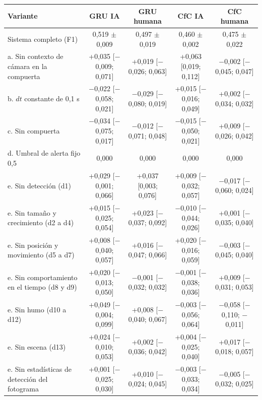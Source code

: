 \begin{tabular}{|l|c|c|c|c|}
\hline
\textbf{Variante} & \textbf{GRU IA} & \textbf{GRU humana} & \textbf{CfC IA} & \textbf{CfC humana} \\ \hline
Sistema completo (F1) & 0{,}519 $\pm$ 0{,}009 & 0{,}497 $\pm$ 0{,}019 & 0{,}460 $\pm$ 0{,}002 & 0{,}475 $\pm$ 0{,}022 \\ \hline
a. Sin contexto de cámara en la compuerta & +0{,}035 [$-$0{,}009; 0{,}071] & +0{,}019 [$-$0{,}026; 0{,}063] & +0{,}063 [0{,}019; 0{,}112] & $-$0{,}002 [$-$0{,}045; 0{,}047] \\ \hline
b. $dt$ constante de 0{,}1 s & $-$0{,}022 [$-$0{,}058; 0{,}021] & $-$0{,}029 [$-$0{,}080; 0{,}019] & +0{,}015 [$-$0{,}016; 0{,}049] & +0{,}002 [$-$0{,}034; 0{,}032] \\ \hline
c. Sin compuerta & $-$0{,}034 [$-$0{,}075; 0{,}017] & $-$0{,}012 [$-$0{,}071; 0{,}048] & $-$0{,}015 [$-$0{,}050; 0{,}021] & +0{,}009 [$-$0{,}026; 0{,}042] \\ \hline
d. Umbral de alerta fijo 0{,}5 & 0{,}000 & 0{,}000 & 0{,}000 & 0{,}000 \\ \hline
e. Sin detección (d1) & +0{,}029 [$-$0{,}001; 0{,}066] & +0{,}037 [0{,}003; 0{,}076] & +0{,}009 [$-$0{,}032; 0{,}057] & $-$0{,}017 [$-$0{,}060; 0{,}024] \\ \hline
e. Sin tamaño y crecimiento (d2 a d4) & +0{,}015 [$-$0{,}025; 0{,}054] & +0{,}023 [$-$0{,}037; 0{,}092] & $-$0{,}010 [$-$0{,}044; 0{,}026] & +0{,}001 [$-$0{,}035; 0{,}040] \\ \hline
e. Sin posición y movimiento (d5 a d7) & +0{,}008 [$-$0{,}040; 0{,}057] & +0{,}016 [$-$0{,}047; 0{,}066] & +0{,}020 [$-$0{,}016; 0{,}059] & $-$0{,}003 [$-$0{,}045; 0{,}040] \\ \hline
e. Sin comportamiento en el tiempo (d8 y d9) & +0{,}020 [$-$0{,}013; 0{,}050] & $-$0{,}001 [$-$0{,}032; 0{,}032] & $-$0{,}001 [$-$0{,}038; 0{,}036] & +0{,}009 [$-$0{,}031; 0{,}053] \\ \hline
e. Sin humo (d10 a d12) & +0{,}049 [$-$0{,}004; 0{,}099] & +0{,}008 [$-$0{,}040; 0{,}067] & $-$0{,}003 [$-$0{,}056; 0{,}064] & $-$0{,}058 [$-$0{,}110; $-$0{,}011] \\ \hline
e. Sin escena (d13) & +0{,}024 [$-$0{,}010; 0{,}053] & +0{,}002 [$-$0{,}036; 0{,}042] & +0{,}004 [$-$0{,}025; 0{,}040] & +0{,}017 [$-$0{,}018; 0{,}057] \\ \hline
e. Sin estadísticas de detección del fotograma & +0{,}001 [$-$0{,}025; 0{,}030] & +0{,}010 [$-$0{,}024; 0{,}045] & $-$0{,}003 [$-$0{,}033; 0{,}034] & $-$0{,}005 [$-$0{,}032; 0{,}025] \\ \hline
\end{tabular}
